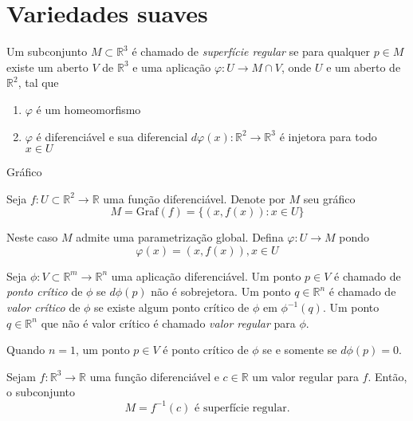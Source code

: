 \section{Variedades suaves}

\begin{defi}
Um subconjunto $M \subset \mathbb{R}^3$ é chamado de \emph{superfície regular} se para qualquer $p \in M$ existe um aberto $V$ de $\mathbb{R}^3$ e uma aplicação $\varphi: U \rightarrow M \cap V$, onde $U$ e um aberto de $\mathbb{R}^2$, tal que
\begin{enumerate}
    \item $\varphi$ é um homeomorfismo
    \item $\varphi$ é diferenciável e sua diferencial $d\varphi(x): \mathbb{R}^2 \rightarrow \mathbb{R}^3$ é injetora para todo $x \in U$
\end{enumerate}
\end{defi}

Gráfico

\begin{exemplo}
Seja $f: U \subset \mathbb{R}^2 \rightarrow \mathbb{R}$ uma função diferenciável. Denote por $M$ seu gráfico
\begin{equation*}
    M = \text{Graf}(f) = \{ (x,f(x)): x \in U \}
\end{equation*}

Neste caso $M$ admite uma parametrização global. Defina $\varphi: U \rightarrow M$ pondo
\begin{equation*}
    \varphi(x) = (x,f(x)), x \in U
\end{equation*}
\end{exemplo}

\begin{defi}
Seja $\phi: V \subset \mathbb{R}^m \rightarrow \mathbb{R}^n$ uma aplicação diferenciável. Um ponto $p \in V$ é chamado de \emph{ponto crítico} de $\phi$ se $d\phi(p)$ não é sobrejetora. Um ponto $q \in \mathbb{R}^n$ é chamado de \emph{valor crítico} de $\phi$ se existe algum ponto crítico de $\phi$ em $\phi^{-1}(q)$. Um ponto $q \in \mathbb{R}^n$ que não é valor crítico é chamado \emph{valor regular} para $\phi$.
\end{defi}

\begin{obs}
Quando $n=1$, um ponto $p \in V$ é ponto crítico de $\phi$ se e somente se $d\phi(p)=0$.
\end{obs}

\begin{teo}\label{preimagem_de_um_valor_regular}
Sejam $f: \mathbb{R}^3 \rightarrow \mathbb{R}$ uma função diferenciável e $c \in \mathbb{R}$ um valor regular para $f$. Então, o subconjunto
\begin{equation*}
    M = f^{-1}(c) \text{ é superfície regular.}
\end{equation*}
\end{teo}

